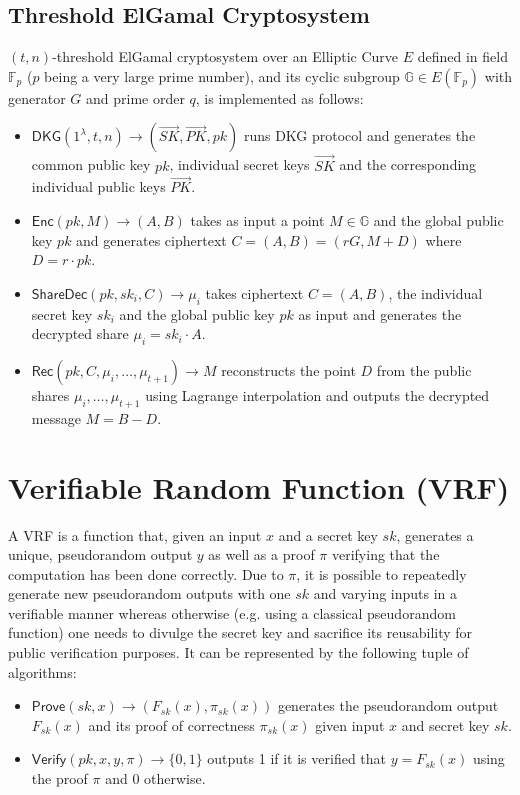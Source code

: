 \documentclass[letterpaper,twocolumn,10pt]{article}
\theoremstyle{definition}
\theoremstyle{remark}
\begin{document}
\subsection{Threshold ElGamal Cryptosystem}
\label{appendix:thrElGamal}
$(t, n)$-threshold ElGamal cryptosystem \cite{desmedt1990Threshold, cherniaeva2019homomorphic} over an Elliptic Curve $E$ defined in field $\mathbb{F}_p$ ($p$ being a very large prime number), and its cyclic subgroup $\mathbb{G} \in E(\mathbb{F}_p)$ with generator $G$ and prime order $q$, is implemented as follows:
\begin{itemize}
    \item $\mathsf{DKG}(1^\lambda, t, n) \rightarrow (\vec{SK}, \vec{PK}, pk)$ runs DKG protocol and generates the common public key $pk$, individual secret keys $\vec{SK}$ and the corresponding individual public keys $\vec{PK}$.
     \item $\mathsf{Enc}(pk, M) \rightarrow (A, B)$  takes as input a point $M \in \mathbb{G}$ and the global public key $pk$ and generates ciphertext $C = (A, B) = (rG, M+D) $ where $D = r \cdot pk$.
     \item $\mathsf{ShareDec}(pk, sk_i, C) \rightarrow \mu_i$ takes ciphertext $C = (A,B)$, the individual secret key $sk_i$ and the global public key $pk$ as input and generates the decrypted share $\mu_i = sk_i \cdot A$.
     \item $\mathsf{Rec}(pk, C, \mu_i, \ldots, \mu_{t+1} ) \rightarrow M$ reconstructs the point $D$ from the public shares $\mu_i, \ldots, \mu_{t+1}$ using Lagrange interpolation and outputs the decrypted message  $M = B - D$.
\end{itemize}

\section{Verifiable Random Function (VRF)}
\label{appendix:vrf}
A VRF \cite{micali1999verifiable,dodis2005verifiable} is a function that, given an input $x$ and a secret key $sk$, generates a unique, pseudorandom output $y$ as well as a proof $\pi$ verifying that the computation has been done correctly. Due to $\pi$, it is possible to repeatedly generate new pseudorandom outputs with one $sk$ and varying inputs in a verifiable manner whereas otherwise (e.g. using a classical pseudorandom function) one needs to divulge the secret key and sacrifice its reusability for public verification purposes. It can be represented by the following tuple of algorithms:
\begin{itemize}
\item $\mathsf{Prove}(sk, x) \rightarrow (F_{sk}(x), \pi_{sk}(x))$ generates the pseudorandom output $F_{sk}(x)$ and its proof of correctness $\pi_{sk}(x)$ given input $x$ and secret key $sk$.
\item $\mathsf{Verify}(pk, x, y, \pi) \rightarrow \{0, 1\}$ outputs 1 if it is verified that $y = F_{sk}(x)$ using the proof $\pi$ and 0 otherwise.
\end{itemize}
\end{document}
